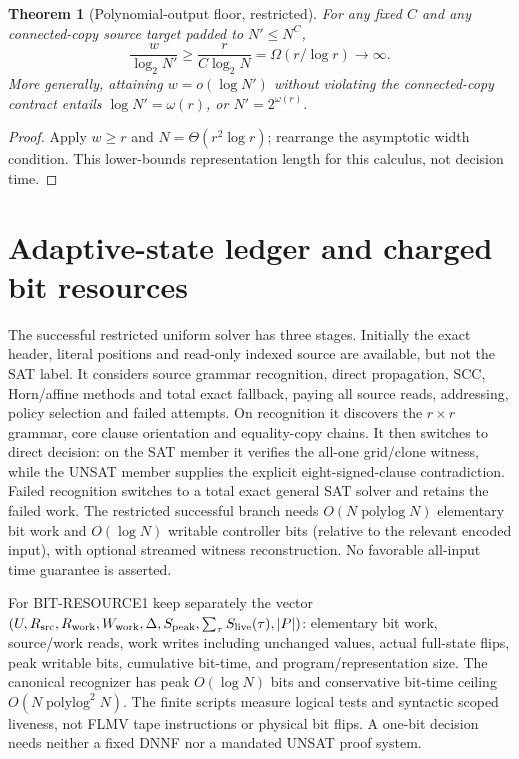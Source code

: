 \documentclass[11pt]{article}
\newtheorem{theorem}{Theorem}
\begin{document}
\begin{theorem}[Polynomial-output floor, restricted]
For any fixed $C$ and any connected-copy source target padded to $N'\le N^C$,
\[
 \frac{w}{\log_2N'}\ge\frac{r}{C\log_2N}
 =\Omega(r/\log r)\longrightarrow\infty.\tag{7}
\]
More generally, attaining $w=o(\log N')$ without violating the connected-copy contract entails $\log N'=\omega(r)$, or $N'=2^{\omega(r)}$.
\end{theorem}
\begin{proof}
Apply $w\ge r$ and $N=\Theta(r^2\log r)$; rearrange the asymptotic width condition. This lower-bounds representation length for this calculus, not decision time.
\end{proof}

\section{Adaptive-state ledger and charged bit resources}
The successful restricted uniform solver has three stages. Initially the exact header, literal positions and read-only indexed source are available, but not the SAT label. It considers source grammar recognition, direct propagation, SCC, Horn/affine methods and total exact fallback, paying all source reads, addressing, policy selection and failed attempts. On recognition it discovers the $r\times r$ grammar, core clause orientation and equality-copy chains. It then switches to direct decision: on the SAT member it verifies the all-one grid/clone witness, while the UNSAT member supplies the explicit eight-signed-clause contradiction. Failed recognition switches to a total exact general SAT solver and retains the failed work. The restricted successful branch needs $O(N\operatorname{polylog}N)$ elementary bit work and $O(\log N)$ writable controller bits (relative to the relevant encoded input), with optional streamed witness reconstruction. No favorable all-input time guarantee is asserted.

For BIT-RESOURCE1 keep separately the vector $(U,R_{\rm src},R_{\rm work},W_{\rm work},\Delta,S_{\rm peak},\sum_\tau S_{\rm live}(\tau),|P|)$: elementary bit work, source/work reads, work writes including unchanged values, actual full-state flips, peak writable bits, cumulative bit-time, and program/representation size. The canonical recognizer has peak $O(\log N)$ bits and conservative bit-time ceiling $O(N\operatorname{polylog}^2N)$. The finite scripts measure logical tests and syntactic scoped liveness, not FLMV tape instructions or physical bit flips. A one-bit decision needs neither a fixed DNNF nor a mandated UNSAT proof system.
\end{document}
